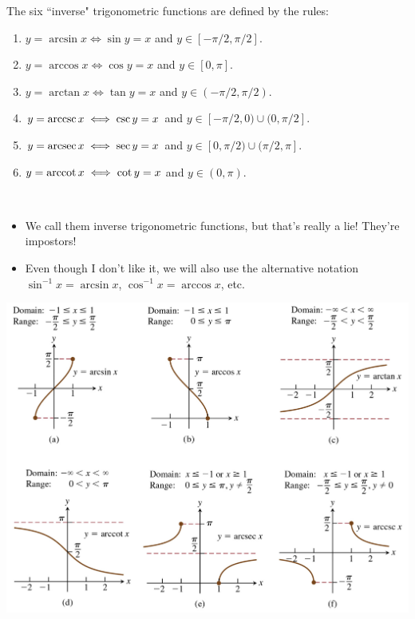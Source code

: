 \begin{definition}
The six ``inverse" trigonometric functions are defined by the rules:
\begin{enumerate}
\item $y=\arcsin x \iff \sin y = x$ and $y\in [-\pi/2, \pi/2]$.
\item $y = \arccos x \iff \cos y = x$ and $y\in [0,\pi]$.
\item $y = \arctan x \iff \tan y = x$ and $y\in (-\pi/2, \pi/2)$.
\item $y=\operatorname{arccsc} x \iff \csc y = x$ and $y\in [-\pi/2, 0)\cup (0, \pi/2]$.
\item $y = \operatorname{arcsec} x \iff \sec y = x$ and $y\in [0, \pi/2)\cup (\pi/2, \pi]$.
\item $y = \operatorname{arccot} x \iff \cot y = x$ and $y\in (0,\pi)$.
\end{enumerate}
\end{definition}
\begin{remark}\,
\begin{itemize}
\item We call them inverse trigonometric functions, but that's really a lie!  They're impostors!
\item Even though I don't like it, we will also use the alternative notation $\sin^{-1} x = \arcsin x$, $\cos^{-1} x = \arccos x$, etc.
\end{itemize}
\end{remark}

\includegraphics[width=6.5in]{img/inverse_trig_graphs}

\newpage

